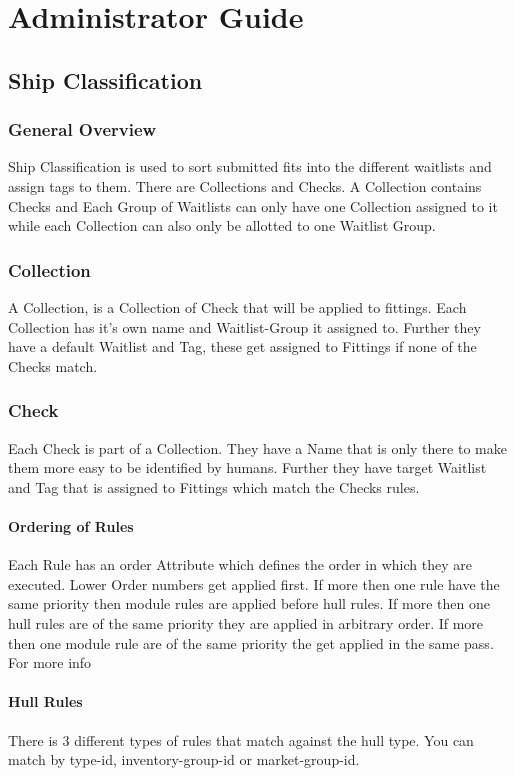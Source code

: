 \documentclass[oneside,a4paper]{article}
\begin{document}
\section{Administrator Guide}
\subsection{Ship Classification}
\subsubsection{General Overview}

Ship Classification is used to sort submitted fits into the different waitlists and assign tags to them. There are Collections and Checks. A Collection contains Checks and Each Group of Waitlists can only have one Collection assigned to it while each Collection can also only be allotted to one Waitlist Group.

\subsubsection{Collection}
A Collection, is a Collection of Check that will be applied to fittings.
Each Collection has it's own name and Waitlist-Group it assigned to. Further they have a default Waitlist and Tag, these get assigned to Fittings if none of the Checks match.

\subsubsection{Check}
Each Check is part of a Collection.
They have a Name that is only there to make them more easy to be identified by humans.
Further they have target Waitlist and Tag that is assigned to Fittings which match the Checks rules.

\paragraph{Ordering of Rules}
Each Rule has an order Attribute which defines the order in which they are executed.
Lower Order numbers get applied first.
If more then one rule have the same priority then module rules are applied before hull rules.
If more then one hull rules are of the same priority they are applied in arbitrary order.
If more then one module rule are of the same priority the get applied in the same pass. For more info 

\paragraph{Hull Rules}
There is 3 different types of rules that match against the hull type. You can match by type-id, inventory-group-id or market-group-id.
\end{document}
